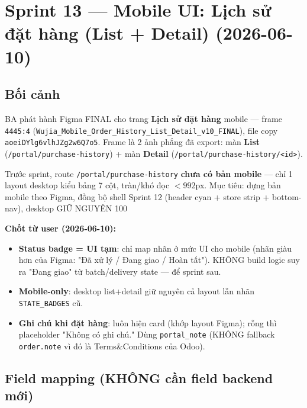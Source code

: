 \chapter{Sprint 13 --- Mobile UI: Lịch sử đặt hàng (List + Detail) (2026-06-10)}

\section{Bối cảnh}

BA phát hành Figma FINAL cho trang \textbf{Lịch sử đặt hàng} mobile --- frame
\texttt{4445:4} (\texttt{Wujia\_Mobile\_Order\_History\_List\_Detail\_v10\_FINAL}),
file copy \texttt{aoeiDYlg6vlhJZg2w6Q7o5}. Frame là 2 ảnh phẳng đã export:
màn \textbf{List} (\texttt{/portal/purchase-history}) + màn \textbf{Detail}
(\texttt{/portal/purchase-history/<id>}).

Trước sprint, route \texttt{/portal/purchase-history} \textbf{chưa có bản mobile} ---
chỉ 1 layout desktop kiểu bảng 7 cột, tràn/khó đọc \(<992\)px. Mục tiêu: dựng bản
mobile theo Figma, đồng bộ shell Sprint 12 (header cyan + store strip + bottom-nav),
desktop GIỮ NGUYÊN 100%

\textbf{Chốt từ user (2026-06-10):}
\begin{itemize}
  \item \textbf{Status badge = UI tạm}: chỉ map nhãn ở mức UI cho mobile (nhãn giàu
        hơn của Figma: "Đã xử lý / Đang giao / Hoàn tất"). KHÔNG build logic suy ra
        "Đang giao" từ batch/delivery state --- để sprint sau.
  \item \textbf{Mobile-only}: desktop list+detail giữ nguyên cả layout lẫn nhãn
        \texttt{STATE\_BADGES} cũ.
  \item \textbf{Ghi chú khi đặt hàng}: luôn hiện card (khớp layout Figma); rỗng thì
        placeholder "Không có ghi chú." Dùng \texttt{portal\_note} (KHÔNG fallback
        \texttt{order.note} vì đó là Terms\&Conditions của Odoo).
\end{itemize}

\section{Field mapping (KHÔNG cần field backend mới)}


